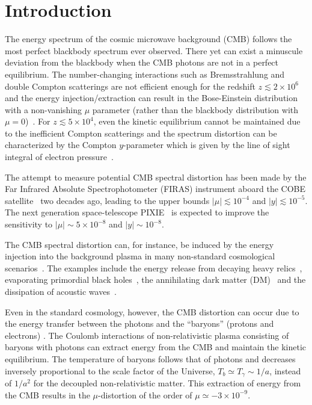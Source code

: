 \documentclass[5p,times]{elsarticle}
\begin{document}
\section{Introduction}
\label{intro}
The energy spectrum of the cosmic microwave background (CMB) follows the most perfect blackbody spectrum ever observed. There yet can exist a minuscule deviation from the blackbody when the CMB photons are not in a perfect equilibrium.
The number-changing interactions such as Bremsstrahlung and double Compton scatterings are not efficient enough for the redshift $z\lesssim 2\times 10^6$ and the energy injection/extraction can result in the Bose-Einstein distribution with a non-vanishing $\mu$ parameter (rather than the blackbody distribution with $\mu=0$)~\cite{Sunyaev:1970er}. For $z\lesssim 5\times 10^4$, even the kinetic equilibrium cannot be maintained due to the inefficient Compton scatterings and the spectrum distortion can be characterized by the Compton $y$-parameter which is given by the line of sight integral of electron pressure~\cite{Zeldovich:1969ff}.

The attempt to measure potential CMB spectral distortion has been made by the Far Infrared Absolute Spectrophotometer (FIRAS) instrument aboard the COBE satellite~\cite{Fixsen:1996nj} two decades ago, leading to the upper bounds $|\mu| \lesssim 10^{-4}$ and $|y|\lesssim 10^{-5}$. The next generation space-telescope PIXIE~\cite{Kogut:2011xw} is expected to improve the sensitivity to $|\mu|\sim 5\times 10^{-8}$ and $|y|\sim 10^{-8}$. 

The CMB spectral distortion can, for instance, be induced by the energy injection into the background plasma in many non-standard cosmological scenarios~\cite{Chluba:2011hw}. The examples include the energy release from decaying heavy relics~\cite{Hu:1993gc,Sarkar:1984tt}, evaporating primordial black holes~\cite{Carr:2009jm}, the annihilating dark matter (DM)~\cite{McDonald:2000bk,Padmanabhan:2005es} and the dissipation of acoustic waves~\cite{Sunyaev:1970,Chluba:2012gq,Silk:1967kq}. 


Even in the standard cosmology, however, the CMB distortion can occur due to the energy transfer between the photons and the ``baryons'' (protons and electrons) \cite{Chluba:2011hw,Khatri:2011aj,Pajer:2013oca}. The Coulomb interactions of non-relativistic plasma consisting of baryons with photons can extract energy from the CMB and maintain the kinetic equilibrium. The temperature of baryons follows that of photons and decreases inversely proportional to the scale factor of the Universe, $T_b \simeq T_\gamma \sim 1/a$, instead of $1/a^2$ for the decoupled non-relativistic matter. This extraction of energy from the CMB results in the $\mu$-distortion of the order of $\mu\simeq -3\times 10^{-9}$.
\end{document}
